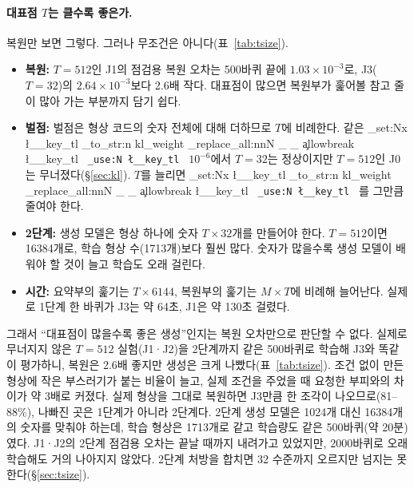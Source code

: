 \documentclass[11pt]{article}
\DeclareRobustCommand{\key}[1]{
  \tl_set:Nx \l__key_tl { \tl_to_str:n {#1} }
  \regex_replace_all:nnN { \_ } { \cO\_ \c{allowbreak} } \l__key_tl
  \texttt{ \tl_use:N \l__key_tl }
}
\begin{document}
\paragraph{대표점 $T$는 클수록 좋은가.} 복원만 보면 그렇다. 그러나 무조건은 아니다(표~\ref{tab:tsize}).
\begin{itemize}
\item \textbf{복원:} $T=512$인 J1의 점검용 복원 오차는 500바퀴 끝에 $1.03\times10^{-3}$로, J3($T=32$)의
$2.64\times10^{-3}$보다 2.6배 작다. 대표점이 많으면 복원부가 훑어볼 참고 줄이 많아 가는 부분까지 담기 쉽다.
\item \textbf{벌점:} 벌점은 형상 코드의 숫자 전체에 대해 더하므로 $T$에 비례한다. 같은 \key{kl_weight} $10^{-6}$에서
$T=32$는 정상이지만 $T=512$인 J0는 무너졌다(\S\ref{sec:kl}). $T$를 늘리면 \key{kl_weight}를 그만큼 줄여야 한다.
\item \textbf{2단계:} 생성 모델은 형상 하나에 숫자 $T\times32$개를 만들어야 한다. $T=512$이면 16384개로,
학습 형상 수(1713개)보다 훨씬 많다. 숫자가 많을수록 생성 모델이 배워야 할 것이 늘고 학습도 오래 걸린다.
\item \textbf{시간:} 요약부의 훑기는 $T\times6144$, 복원부의 훑기는 $M\times T$에 비례해 늘어난다.
실제로 1단계 한 바퀴가 J3는 약 64초, J1은 약 130초 걸렸다.
\end{itemize}
그래서 ``대표점이 많을수록 좋은 생성''인지는 복원 오차만으로 판단할 수 없다. 실제로 무너지지 않은 $T=512$ 실험(J1·J2)을
2단계까지 같은 500바퀴로 학습해 J3와 똑같이 평가하니, 복원은 2.6배 좋지만 생성은 크게 나빴다(표~\ref{tab:tsize}).
조건 없이 만든 형상에 작은 부스러기가 붙는 비율이 늘고, 실제 조건을 주었을 때 요청한 부피와의 차이가 약 3배로 커졌다.
실제 형상을 그대로 복원하면 J3만큼 한 조각이 나오므로(81--88\%), 나빠진 곳은 1단계가 아니라 2단계다.
2단계 생성 모델은 1024개 대신 16384개의 숫자를 맞춰야 하는데, 학습 형상은 1713개로 같고 학습량도 같은 500바퀴(약 20분)였다.
J1·J2의 2단계 점검용 오차는 끝날 때까지 내려가고 있었지만, 2000바퀴로 오래 학습해도 거의 나아지지 않았다.
2단계 처방을 합치면 32 수준까지 오르지만 넘지는 못한다(\S\ref{sec:tsize}).
\end{document}
